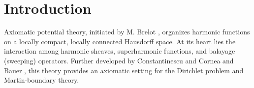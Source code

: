 \documentclass{amsart}
\theoremstyle{definition}
\theoremstyle{remark}
\numberwithin{equation}{section}
\begin{document}
\begin{abstract}
\begin{enumerate}
			\item If the compact convex space of normalized positive harmonic functions is a Choquet simplex, then each Martin representing measure on the minimal boundary corresponds to a unique Keisler measure supported on minimal types and admits a complete lift.
			
			\item Harnack compactness also implies stability of normalized evaluation formulas, yielding canonical bases and a harmonic barycenter factoring through Keisler measures.
		\end{enumerate}
		
		These constructions are further applied to fine potential theory, where boundary poles of potentials are Keisler null. First-jet expansions encode the Rad\'o--Kneser--Choquet and Lewy planar rigidity phenomena, while higher-dimensional failures are analyzed through thorn-forking chains in o-minimal expansions.
	\end{abstract}
	
	
	
	
	\maketitle
	
	\section{Introduction}
	
	Axiomatic potential theory, initiated by M. Brelot \cite{Brelot1960}, organizes harmonic functions on a locally compact, locally connected Hausdorff space. At its heart lies the interaction among harmonic sheaves, superharmonic functions, and balayage (sweeping) operators. Further developed by Constantinescu and Cornea \cite{CC1963axiomatic} and Bauer \cite{bauer2006harmonische}, this theory provides an axiomatic setting for the Dirichlet problem and Martin-boundary theory.
	
\end{document}
